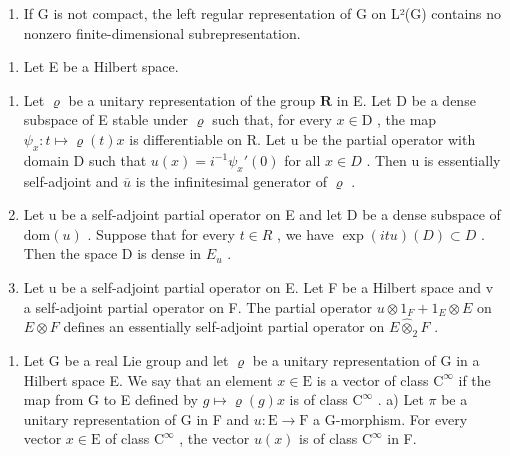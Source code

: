 \begin{enumerate}
\def\labelenumi{\alph{enumi})}
\setcounter{enumi}{1}
\tightlist
\item
  If G is not compact, the left regular representation of G on L²(G) contains no nonzero finite-dimensional subrepresentation.
\end{enumerate}

\begin{enumerate}
\def\labelenumi{\arabic{enumi})}
\setcounter{enumi}{10}
\tightlist
\item
  Let E be a Hilbert space.
\end{enumerate}

\begin{enumerate}
\def\labelenumi{\alph{enumi})}
\item
  Let \(\varrho\) be a unitary representation of the group \(\mathbf{R}\) in E. Let D be a dense subspace of E stable under \(\varrho\) such that, for every \(x\in\mathrm{D}\) , the map \(\psi_{x}:t\mapsto\varrho(t)x\) is differentiable on R. Let u be the partial operator with domain D such that \(u(x) = i^{-1}\psi_x'(0)\) for all \(x \in D\) . Then u is essentially self-adjoint and \(\overline{u}\) is the infinitesimal generator of \(\varrho\) .
\item
  Let u be a self-adjoint partial operator on E and let D be a dense subspace of \(\text{dom}(u)\) . Suppose that for every \(t \in R\) , we have \(\exp(itu)(D) \subset D\) . Then the space D is dense in \(E_{u}\) .
\item
  Let u be a self-adjoint partial operator on E. Let F be a Hilbert space and v a self-adjoint partial operator on F. The partial operator \(u \otimes 1_{F} + 1_{E} \otimes E\) on \(E \otimes F\) defines an essentially self-adjoint partial operator on \(E \widehat{\otimes}_{2} F\) .
\end{enumerate}

\begin{enumerate}
\def\labelenumi{\arabic{enumi})}
\setcounter{enumi}{11}
\tightlist
\item
  Let G be a real Lie group and let \(\varrho\) be a unitary representation of G in a Hilbert space E. We say that an element \(x \in \mathrm{E}\) is a vector of class \(\mathrm{C}^{\infty}\) if the map from G to E defined by \(g \mapsto \varrho(g)x\) is of class \(\mathrm{C}^{\infty}\) . a) Let \(\pi\) be a unitary representation of G in F and \(u: \mathrm{E} \to \mathrm{F}\) a G-morphism. For every vector \(x \in \mathrm{E}\) of class \(\mathrm{C}^{\infty}\) , the vector \(u(x)\) is of class \(\mathrm{C}^{\infty}\) in F.
\end{enumerate}

